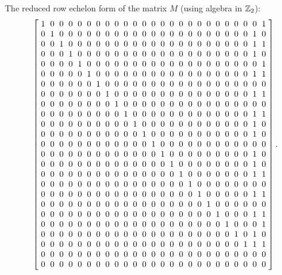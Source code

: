  The reduced row echelon form of the matrix $M$ (using algebra in $\mathbb{Z}_2$):
\[ \arraycolsep=3pt \left[ \begin {array}{ccccccccccccccccccccccccc}
1&0&0&0&0&0&0&0&0&0&0&0&0&0&0&0&0&0&0&0&0&0&0&0&1 \\
0&1&0&0&0&0&0&0&0&0&0&0&0&0&0&0&0&0&0&0&0&0&0&1&0 \\
0&0&1&0&0&0&0&0&0&0&0&0&0&0&0&0&0&0&0&0&0&0&0&1&1 \\
0&0&0&1&0&0&0&0&0&0&0&0&0&0&0&0&0&0&0&0&0&0&0&1&0 \\
0&0&0&0&1&0&0&0&0&0&0&0&0&0&0&0&0&0&0&0&0&0&0&0&1 \\
0&0&0&0&0&1&0&0&0&0&0&0&0&0&0&0&0&0&0&0&0&0&0&1&1 \\
0&0&0&0&0&0&1&0&0&0&0&0&0&0&0&0&0&0&0&0&0&0&0&0&0 \\
0&0&0&0&0&0&0&1&0&0&0&0&0&0&0&0&0&0&0&0&0&0&0&1&1 \\
0&0&0&0&0&0&0&0&1&0&0&0&0&0&0&0&0&0&0&0&0&0&0&0&0 \\
0&0&0&0&0&0&0&0&0&1&0&0&0&0&0&0&0&0&0&0&0&0&0&1&1 \\
0&0&0&0&0&0&0&0&0&0&1&0&0&0&0&0&0&0&0&0&0&0&0&1&0 \\
0&0&0&0&0&0&0&0&0&0&0&1&0&0&0&0&0&0&0&0&0&0&0&1&0 \\
0&0&0&0&0&0&0&0&0&0&0&0&1&0&0&0&0&0&0&0&0&0&0&0&0 \\
0&0&0&0&0&0&0&0&0&0&0&0&0&1&0&0&0&0&0&0&0&0&0&1&0 \\
0&0&0&0&0&0&0&0&0&0&0&0&0&0&1&0&0&0&0&0&0&0&0&1&0 \\
0&0&0&0&0&0&0&0&0&0&0&0&0&0&0&1&0&0&0&0&0&0&0&1&1 \\
0&0&0&0&0&0&0&0&0&0&0&0&0&0&0&0&1&0&0&0&0&0&0&0&0 \\
0&0&0&0&0&0&0&0&0&0&0&0&0&0&0&0&0&1&0&0&0&0&0&1&1 \\
0&0&0&0&0&0&0&0&0&0&0&0&0&0&0&0&0&0&1&0&0&0&0&0&0 \\
0&0&0&0&0&0&0&0&0&0&0&0&0&0&0&0&0&0&0&1&0&0&0&1&1 \\
0&0&0&0&0&0&0&0&0&0&0&0&0&0&0&0&0&0&0&0&1&0&0&0&1 \\
0&0&0&0&0&0&0&0&0&0&0&0&0&0&0&0&0&0&0&0&0&1&0&1&0 \\
0&0&0&0&0&0&0&0&0&0&0&0&0&0&0&0&0&0&0&0&0&0&1&1&1 \\
0&0&0&0&0&0&0&0&0&0&0&0&0&0&0&0&0&0&0&0&0&0&0&0&0 \\
0&0&0&0&0&0&0&0&0&0&0&0&0&0&0&0&0&0&0&0&0&0&0&0&0
\end {array} \right].\]


